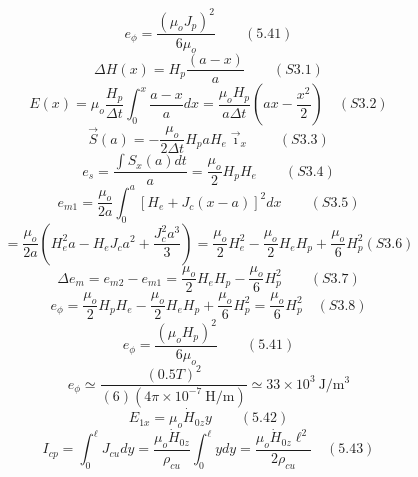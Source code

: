 \begin{equation}%
e_{\phi}=\frac{(\mu_{o}J_{p})^{2}}{6\mu_{o}}\qquad(5.41)
\end{equation}
\begin{equation}%
\Delta H(x)=H_{p}\frac{(a-x)}{a}\qquad(S3.1)
\end{equation}
\begin{equation}%
E(x)=\mu_{o}\frac{H_{p}}{\Delta t}\int_{0}^{x}\frac{a-x}{a}dx=\frac{\mu_{o}H_{p}}{a\Delta t}(ax-\frac{x^{2}}{2})\quad(S3.2)
\end{equation}
\begin{equation}%
\vec{S}(a)=-\frac{\mu_{o}}{2\Delta t}H_{p}aH_{e}\vec{\imath}_{x}\qquad(S3.3)
\end{equation}
\begin{equation}%
e_{s}=\frac{\int S_{x}(a)dt}{a}=\frac{\mu_{o}}{2}H_{p}H_{e}\qquad(S3.4)
\end{equation}
\begin{equation}%
e_{m1}=\frac{\mu_{o}}{2a}\int_{0}^{a}[H_{e}+J_{c}(x-a)]^{2}dx\qquad(S3.5)
\end{equation}
\begin{equation}%
=\frac{\mu_{o}}{2a}(H_{e}^{2}a-H_{e}J_{c}a^{2}+\frac{J_{c}^{2}a^{3}}{3})=\frac{\mu_{o}}{2}H_{e}^{2}-\frac{\mu_{o}}{2}H_{e}H_{p}+\frac{\mu_{o}}{6}H_{p}^{2}(S3.6)
\end{equation}
\begin{equation}%
\Delta e_{m}=e_{m2}-e_{m1}=\frac{\mu_{o}}{2}H_{e}H_{p}-\frac{\mu_{o}}{6}H_{p}^{2}\qquad(S3.7)
\end{equation}
\begin{equation}%
e_{\phi}=\frac{\mu_{o}}{2}H_{p}H_{e}-\frac{\mu_{o}}{2}H_{e}H_{p}+\frac{\mu_{o}}{6}H_{p}^{2}=\frac{\mu_{o}}{6}H_{p}^{2}\quad(S3.8)
\end{equation}
\begin{equation}%
e_{\phi}=\frac{(\mu_{o}H_{p})^{2}}{6\mu_{o}}\qquad(5.41)
\end{equation}
\begin{equation}%
e_{\phi}\simeq\frac{(0.5T)^{2}}{(6)(4\pi\times10^{-7}\ \mathrm{H/m})}\simeq33\times10^{3}\ \mathrm{J/m^{3}}
\end{equation}
\begin{equation}%
E_{1x}=\mu_{o}\dot{H}_{0z}y\qquad(5.42)
\end{equation}
\begin{equation}%
I_{cp}=\int_{0}^{\ell}J_{cu}dy=\frac{\mu_{o}\dot{H}_{0z}}{\rho_{cu}}\int_{0}^{\ell}ydy=\frac{\mu_{o}\dot{H}_{0z}\ell^{2}}{2\rho_{cu}}\quad(5.43)
\end{equation}
